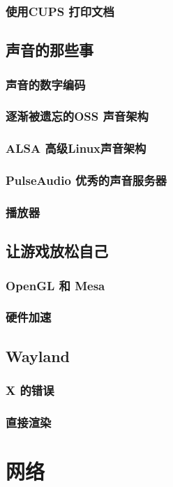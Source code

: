 \documentclass[amstex,twoside]{ctexbook}
\begin{document}
\subsection{使用CUPS 打印文档	}
\section{ 声音的那些事	}
\subsection{  声音的数字编码	}
\subsection{  逐渐被遗忘的OSS	声音架构}
\subsection{ ALSA 高级Linux声音架构}
\subsection{  PulseAudio 优秀的声音服务器	}
\subsection{  播放器	}
\section{  让游戏放松自己	}
\subsection{  OpenGL 和 Mesa	}
\subsection{  硬件加速	}
\section{  Wayland	}
\subsection{ X 的错误	}
\subsection{  直接渲染}

\chapter{网络}
\end{document}
